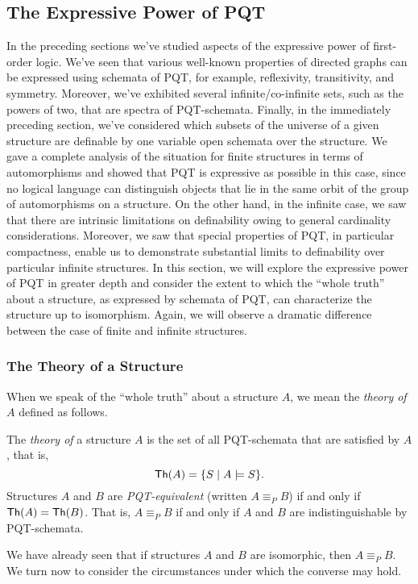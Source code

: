 \subsection{The Expressive Power of PQT}
In the preceding sections we've studied aspects of the expressive power of first-order logic. We've seen that various well-known properties of directed graphs can be expressed using schemata of PQT, for example, reflexivity, transitivity, and symmetry. 
Moreover, we've exhibited several infinite/co-infinite sets, such as the powers of two, that are spectra of PQT-schemata. Finally, in the immediately preceding section, we've considered which subsets of the universe of a given structure are definable by one variable open schemata over the structure. We gave a complete analysis of the situation for finite structures in terms of automorphisms and showed that PQT is expressive as possible in this case, since no logical language can distinguish objects that lie in the same orbit of the group of automorphisms on a structure. On the other hand, in the infinite case, we saw that there are intrinsic limitations on definability owing to general cardinality considerations. Moreover, we saw that special properties of PQT, in particular compactness, enable us to demonstrate substantial limits to definability over particular infinite structures. In this section, we will explore the expressive power of PQT in greater depth and consider the extent to which the ``whole truth'' about a structure, as expressed by schemata of PQT, can characterize the structure up to isomorphism. Again, we will observe a dramatic difference between the case of finite and infinite structures.
\subsubsection*{The Theory of a Structure}

When we speak of the ``whole truth'' about a structure $A$, we mean the \emph{theory of} $A$ defined as follows.
\begin{definition}\label{theo-def}
The \emph{theory of} a structure $A$ is the set of all PQT-schemata that are satisfied by $A$, that is,
\[
\mbox{${\mathsf{Th}}(A)$}=\{S\mid A\models S\}.
\]
Structures $A$ and $B$ are \emph{PQT-equivalent} (written $A\equiv_P B$) if and only if
$\mbox{${\mathsf{Th}}(A)$}=\mbox{${\mathsf{Th}}(B)$}$. That is, $A\equiv_P B$ if and only if $A$ and $B$ are indistinguishable by PQT-schemata.
\end{definition}
We have already seen that if structures $A$ and $B$ are isomorphic, then $A\equiv_P B$. We turn now to consider the circumstances under which the converse may hold.
